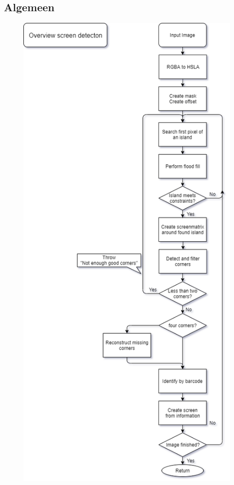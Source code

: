 \documentclass[a4paper,11pt]{article}
\begin{document}
\subsection{Algemeen}
\begin{figure}[H]
	\centering
	\includegraphics[scale= 0.5]{img/algoOverview.png}
	\caption{}
	\label{bijlageA1}
\end{figure}
\newpage
\end{document}
